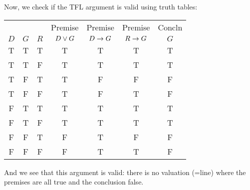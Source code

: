 Now, we check if the TFL argument is valid using truth tables:
\begin{center}
\begin{tabular}{ccc|cccc}
&&&Premise&Premise&Premise&Concln\\
$D$&$G$&$R$&$D\vee G$&$D\rightarrow G$&$R\rightarrow G$&$G$\\\hline
T&T&T&T&T&T&T\\
T&T&F&T&T&T&T\\
T&F&T&T&F&F&F\\
T&F&F&T&F&T&F\\
F&T&T&T&T&T&T\\
F&T&F&T&T&T&T\\
F&F&T&F&T&F&F\\
F&F&F&F&T&T&F
\end{tabular}
\end{center}
And we see that this argument is valid: there is no valuation (=line) where the premises are all true and the conclusion false.



